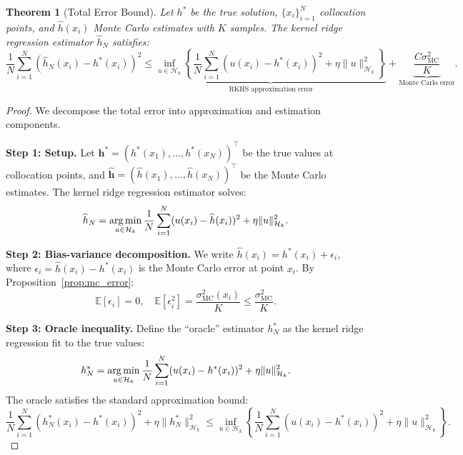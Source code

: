 \documentclass[10pt,a4paper]{amsart}
\newtheorem{theorem}{Theorem}
\newcommand{\E}{\mathbb{E}}
\newcommand{\RKHS}{\mathcal{H}_k}
\newcommand{\argmin}{\operatornamewithlimits{arg\,min}}
\begin{document}
\begin{theorem}[Total Error Bound]\label{thm:total_error}
Let $h^*$ be the true solution, $\{x_i\}_{i=1}^N$ collocation points, and $\widehat{h}(x_i)$ Monte Carlo estimates with $K$ samples. The kernel ridge regression estimator $\widehat{h}_N$ satisfies:
\begin{equation}
\frac{1}{N}\sum_{i=1}^N (\widehat{h}_N(x_i) - h^*(x_i))^2 \leq \underbrace{\inf_{u \in \RKHS}\left\{\frac{1}{N}\sum_{i=1}^N(u(x_i) - h^*(x_i))^2 + \eta\|u\|_{\RKHS}^2\right\}}_{\text{RKHS approximation error}} + \underbrace{\frac{C\sigma_{\mathrm{MC}}^2}{K}}_{\text{Monte Carlo error}}.
\end{equation}
\end{theorem}

\begin{proof}
We decompose the total error into approximation and estimation components.

\textbf{Step 1: Setup.}
Let $\mathbf{h}^* = (h^*(x_1), \ldots, h^*(x_N))^\top$ be the true values at collocation points, and $\widehat{\mathbf{h}} = (\widehat{h}(x_1), \ldots, \widehat{h}(x_N))^\top$ be the Monte Carlo estimates. The kernel ridge regression estimator solves:
\begin{equation}
\widehat{h}_N = \argmin_{u \in \RKHS} \frac{1}{N}\sum_{i=1}^N (u(x_i) - \widehat{h}(x_i))^2 + \eta \|u\|_{\RKHS}^2.
\end{equation}

\textbf{Step 2: Bias-variance decomposition.}
We write $\widehat{h}(x_i) = h^*(x_i) + \epsilon_i$, where $\epsilon_i = \widehat{h}(x_i) - h^*(x_i)$ is the Monte Carlo error at point $x_i$. By Proposition~\ref{prop:mc_error}:
\begin{equation}
\E[\epsilon_i] = 0, \quad \E[\epsilon_i^2] = \frac{\sigma_{\mathrm{MC}}^2(x_i)}{K} \leq \frac{\sigma_{\mathrm{MC}}^2}{K}.
\end{equation}

\textbf{Step 3: Oracle inequality.}
Define the ``oracle'' estimator $h_N^*$ as the kernel ridge regression fit to the true values:
\begin{equation}
h_N^* = \argmin_{u \in \RKHS} \frac{1}{N}\sum_{i=1}^N (u(x_i) - h^*(x_i))^2 + \eta \|u\|_{\RKHS}^2.
\end{equation}
The oracle satisfies the standard approximation bound:
\begin{equation}
\frac{1}{N}\sum_{i=1}^N (h_N^*(x_i) - h^*(x_i))^2 + \eta\|h_N^*\|_{\RKHS}^2 \leq \inf_{u \in \RKHS}\left\{\frac{1}{N}\sum_{i=1}^N(u(x_i) - h^*(x_i))^2 + \eta\|u\|_{\RKHS}^2\right\}.
\end{equation}


\end{proof}
\end{document}

